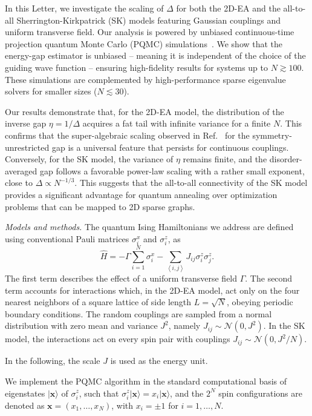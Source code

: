 \documentclass[aps,prl,twocolumn,superscriptaddress,nofootinbib]{revtex4-2}
\begin{document}
In this Letter, we investigate the scaling of $\Delta$ for both the 2D-EA and the all-to-all Sherrington-Kirkpatrick (SK) models featuring Gaussian couplings and uniform transverse field. Our analysis is powered by unbiased continuous-time projection quantum Monte Carlo (PQMC) simulations~\cite{becca2017quantum}. We show that the energy-gap estimator is unbiased  -- meaning it is independent of the choice of the guiding wave function -- ensuring high-fidelity results for systems up to $N \gtrsim 100$. These simulations are complemented by high-performance sparse eigenvalue solvers for smaller sizes ($N \lesssim 30$).

Our results demonstrate that, for the 2D-EA model, the distribution of the inverse gap $\eta = 1/\Delta$ acquires a fat tail with infinite variance for a finite $N$. This confirms that the super-algebraic scaling observed in Ref.~\cite{Bernaschi2024} for the symmetry-unrestricted gap is a universal feature that persists for continuous couplings. Conversely, for the SK model, the variance of $\eta$ remains finite, and the disorder-averaged gap follows a favorable power-law scaling with a rather small exponent, close to $\Delta \propto N^{-1/3}$. This suggests that the all-to-all connectivity of the SK model provides a significant advantage for quantum annealing over optimization problems that can be mapped to 2D sparse graphs.

\emph{Models and methods.}
The quantum Ising Hamiltonians we address are defined using conventional Pauli matrices $\sigma^x_{i}$ and $\sigma^z_{i}$, as
\begin{equation}
\hat{H}=-\Gamma \sum_{i=1}^{N} {\sigma}^{x}_{i} -\sum_{\left<i,j\right>} J_{ij}{\sigma}^{z}_{i} {\sigma}^{z}_{j}.
\label{H}
\end{equation}
The first term describes the effect of a uniform transverse field $\Gamma$. The second term accounts for interactions which, in the 2D-EA model, act only on the four nearest neighbors of a square lattice of side length $L=\sqrt{N}$, obeying periodic boundary conditions. The random couplings are sampled from a normal distribution with zero mean and variance $J^2$, namely $J_{ij} \sim \mathcal{N}(0, J^2)$. In the SK model, the interactions act on every spin pair with couplings $J_{ij} \sim \mathcal{N}(0, J^2/N)$.

In the following, the scale $J$ is used as the energy unit.

We implement the PQMC algorithm in the standard computational basis of eigenstates $|{\mathbf x} \rangle$ of $\sigma^z_i$, such that $\sigma^z_i| {\mathbf x} \rangle = x_i | {\mathbf x} \rangle$, and the $2^N$ spin configurations are denoted as ${\mathbf x} = (x_1,\dots,x_N)$, with $x_i=\pm1$ for $i=1,\dots,N$.
\end{document}
